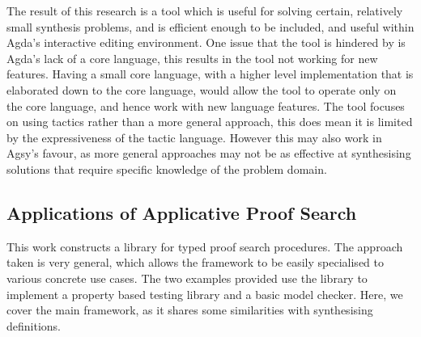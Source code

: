 \documentclass[a4paper]{article}
\begin{document}
The result of this research is a tool which is useful for solving certain, relatively small synthesis problems, and is efficient 
enough to be included, and useful within Agda's interactive editing environment. One issue that the tool is hindered by is Agda's lack of a core language,
this results in the tool not working for new features. Having a small core 
language, with a higher level implementation that is elaborated down to the core language, would allow the tool to operate only
on the core language, and hence work with new language features. The tool focuses 
on using tactics rather than a more general approach, this does mean it is limited by the expressiveness of the tactic language.
However this may also work in Agsy's favour, as more general approaches may not be as effective at synthesising solutions that 
require specific knowledge of the problem domain.

\subsection{Applications of Applicative Proof Search}
\label{sec:org19e1627}
This work constructs a library for typed proof search procedures. The approach taken is very general, which allows the 
framework to be easily specialised to various concrete use cases. The two examples provided use the library to implement a 
property based testing library and a basic model checker. Here, we cover the main framework, as it shares some similarities 
with synthesising definitions. 
\end{document}
